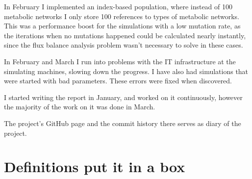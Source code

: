 \documentclass[a4paper,12pt]{article}
\begin{document}
	In February I implemented an index-based population, where instead of 100 metabolic networks I only store 100 references to types of metabolic networks. This was a performance boost for the simulations with a low mutation rate, as the iterations when no mutations happened could be calculated nearly instantly, since the flux balance analysis problem wasn't necessary to solve in these cases. 

	In February and March I run into problems with the IT infrastructure at the simulating machines, slowing down the progress. I have also had simulations that were started with bad parameters. These errors were fixed when discovered. 

	I started writing the report in January, and worked on it continuously, however the majority of the work on it was done in March. 

	The project's GitHub page \cite{owngithub} and the commit history there serves as diary of the project. 
	\cleardoublepage
	\section*{Definitions put it in a box}
\end{document}
